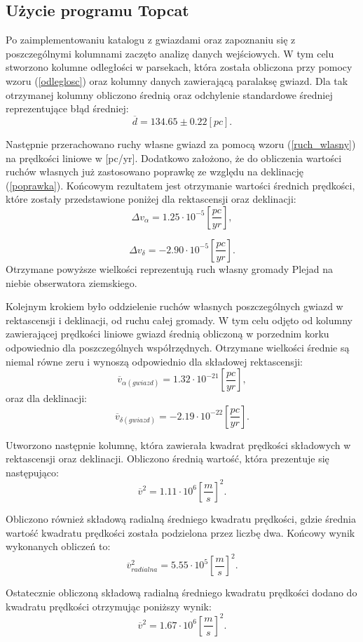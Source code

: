 \documentclass{aa}
\begin{document}
\subsection{Użycie programu Topcat}
Po zaimplementowaniu katalogu z gwiazdami oraz zapoznaniu się z poszczególnymi kolumnami  zaczęto analizę danych wejściowych. W tym celu stworzono kolumne odległości w parsekach, która została obliczona przy pomocy wzoru (\ref{odleglosc}) oraz kolumny danych zawierającą paralaksę gwiazd. Dla tak otrzymanej kolumny obliczono średnią oraz odchylenie standardowe średniej reprezentujące błąd średniej: $$\overline{d} = 134.65 \pm 0.22 [pc].$$

Następnie przerachowano ruchy własne gwiazd za pomocą wzoru (\ref{ruch_wlasny}) na prędkości liniowe w [pc/yr]. Dodatkowo założono, że do obliczenia wartości ruchów własnych już zastosowano poprawkę ze względu na deklinację (\ref{poprawka}). Końcowym rezultatem jest otrzymanie wartości średnich prędkości, które zostały przedstawione poniżej dla rektascensji oraz deklinacji: $$\Delta v_{\alpha} = 1.25 \cdot 10^{-5} \left [ \frac{pc}{yr} \right ],$$

$$\Delta v_{\delta} = -2.90 \cdot 10 ^ {-5} \left [ \frac{pc}{yr} \right ].$$
Otrzymane powyższe wielkości reprezentują ruch własny gromady Plejad na niebie obserwatora ziemskiego. 

Kolejnym krokiem było oddzielenie ruchów własnych poszczególnych gwiazd w rektascensji i deklinacji, od ruchu całej gromady. W tym celu odjęto od kolumny zawierającej prędkości liniowe gwiazd średnią obliczoną w porzednim korku odpowiednio dla poszczególnych współrzędnych. Otrzymane wielkości średnie są niemal równe zeru i wynoszą odpowiednio dla składowej rektascensji: $$\overline{v}_{\alpha(gwiazd)} = 1.32 \cdot 10^{-21} \left [ \frac{pc}{yr} \right ],$$ oraz dla deklinacji: $$\overline{v}_{\delta(gwiazd)} = -2.19 \cdot 10^{-22} \left [ \frac{pc}{yr} \right ].$$

Utworzono następnie kolumnę, która zawierała kwadrat prędkości składowych w rektascensji oraz deklinacji. Obliczono średnią wartość, która prezentuje się następująco: $$\overline{v} ^ 2 = 1.11 \cdot 10 ^ 6 \left [ \frac{m}{s} \right ] ^ 2.$$

Obliczono również składową radialną średniego kwadratu prędkości, gdzie średnia wartość kwadratu prędkości została podzielona przez liczbę dwa. Końcowy wynik wykonanych obliczeń to: $$\overline{v}_{radialna} ^ 2 = 5.55 \cdot 10 ^ 5 \left [ \frac{m}{s} \right ] ^ 2.$$

Ostatecznie obliczoną składową radialną średniego kwadratu prędkości dodano do kwadratu prędkości otrzymując poniższy wynik: $$\overline{v} ^ 2 = 1.67 \cdot 10 ^ 6 \left [ \frac{m}{s} \right ] ^ 2.$$
\end{document}
